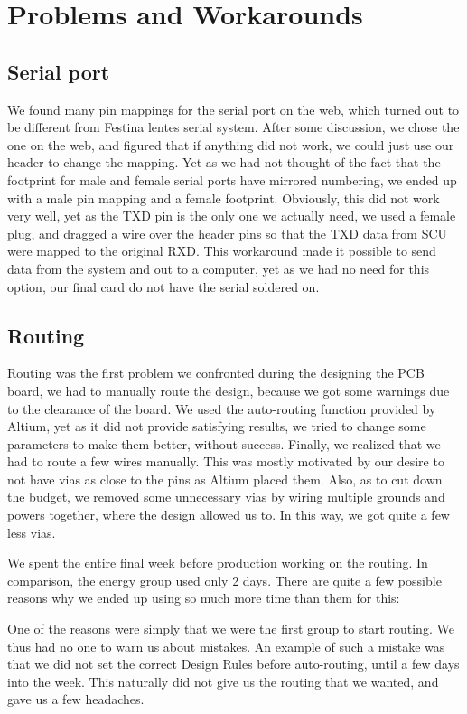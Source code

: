 \section {Problems and Workarounds}
\subsection{Serial port}
We found many pin mappings for the serial port on the web, which turned out to
be different from Festina lentes serial system. After some discussion, we chose
the one on the web, and figured that if anything did not work, we could just
use our header to change the mapping.  Yet as we had not thought of the fact
that the footprint for male and female serial ports have mirrored numbering,
we ended up with a male pin mapping and a female footprint.  Obviously,
this did not work very well, yet as the TXD pin is the only one we actually
need, we used a female plug, and dragged a wire over the header pins so that
the TXD data from SCU were mapped to the original RXD. This workaround made it
possible to send data from the system and out to a computer, yet as we had no
need for this option, our final card do not have the serial soldered on.

\subsection{Routing}
Routing was the first problem we confronted during the designing the \ac{PCB}
board, we had to manually route the design, because we got some warnings due to
the clearance of the board. We used the auto-routing function provided by
Altium, yet as it did not provide satisfying results, we tried to change some
parameters to make them better, without success. Finally, we realized that we
had to route a few wires manually. This was mostly motivated by our desire to
not have vias as close to the pins as Altium placed them. Also, as to cut down
the budget, we removed some unnecessary vias by wiring multiple grounds and
powers together, where the design allowed us to. In this way, we got quite a few
less vias.

We spent the entire final week before production working on the routing. In comparison, the energy group used only 2 days. There are quite a few possible reasons why we ended up using so much more time than them for this:

One of the reasons were simply that we were the first group to start routing. We thus had no one to warn us about mistakes. An example of such a mistake was that we did not set the correct Design Rules before auto-routing, until a few days into the week. This naturally did not give us the routing that we wanted, and gave us a few headaches.

